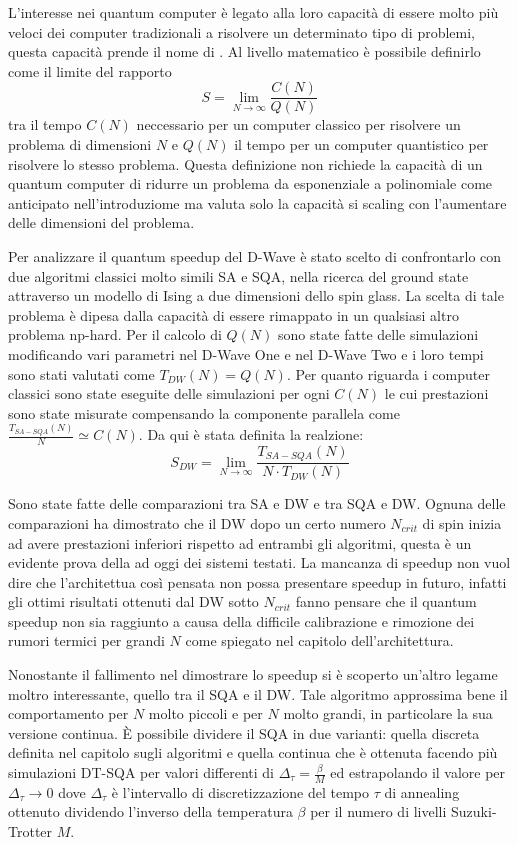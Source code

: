 L'interesse nei quantum computer è legato alla loro capacità di essere molto più veloci dei computer tradizionali a risolvere un determinato tipo di problemi, questa capacità prende il nome di . Al livello matematico è possibile definirlo\cite{DDQS} come il limite del rapporto
$$S = \lim_{N \to \infty} \frac{C(N)}{Q(N)}$$
tra il tempo $C(N)$ neccessario per un computer classico per risolvere un problema di dimensioni $N$ e $Q(N)$ il tempo per un computer quantistico per risolvere lo stesso problema. Questa definizione non richiede la capacità di un quantum computer di ridurre un problema da esponenziale a polinomiale come anticipato nell'introduziome ma valuta solo la capacità si scaling con l'aumentare delle dimensioni del problema.

Per analizzare il quantum speedup del D-Wave è stato scelto di confrontarlo con due algoritmi classici molto simili SA e SQA, nella ricerca del ground state attraverso un modello di Ising a due dimensioni dello spin glass.
La scelta di tale problema è dipesa dalla capacità di essere rimappato in un qualsiasi altro problema np-hard. Per il calcolo di $Q(N)$ sono state fatte delle simulazioni modificando vari parametri nel D-Wave One e nel D-Wave Two e i loro tempi sono stati valutati come $T_{DW}(N) = Q(N)$. Per quanto riguarda i computer classici sono state eseguite delle simulazioni per ogni $C(N)$ le cui prestazioni sono state misurate compensando la componente parallela\cite{EQA} come
 $\frac{T_{SA-SQA}(N)}{N} \simeq C(N)$. Da qui è stata definita\cite{DDQS} la realzione:
$$S_{DW} = \lim_{N \to \infty} \frac{T_{SA-SQA}(N)}{N \cdot T_{DW}(N)}$$

Sono state fatte delle comparazioni tra SA e DW\cite{DDQS} e tra SQA e DW\cite{QVC}. Ognuna delle comparazioni ha dimostrato che il DW dopo un certo numero $N_{crit}$ di spin inizia ad avere prestazioni inferiori rispetto ad entrambi gli algoritmi, questa è un evidente prova della  ad oggi dei sistemi testati. La mancanza di speedup non vuol dire che l'architettua così pensata non possa presentare speedup in futuro, infatti gli ottimi risultati ottenuti dal DW sotto $N_{crit}$ fanno pensare che il quantum speedup non sia raggiunto a causa della difficile calibrazione e rimozione dei rumori termici per grandi $N$ come spiegato nel capitolo dell'architettura.

Nonostante il fallimento nel dimostrare lo speedup si è scoperto un'altro legame moltro interessante, quello tra il SQA e il DW. Tale algoritmo approssima bene il comportamento per $N$ molto piccoli e per $N$ molto grandi\cite{EQA}, in particolare la sua versione continua\cite{QVC}. È possibile dividere il SQA in due varianti: quella  discreta definita nel capitolo sugli algoritmi e quella  continua che è ottenuta facendo più simulazioni DT-SQA per valori differenti di $\Delta_\tau = \frac{\beta}{M}$ ed estrapolando il valore per $\Delta_\tau \to 0$\cite{EQA,QVC} dove $\Delta_\tau$ è l'intervallo di discretizzazione del tempo $\tau$ di annealing ottenuto dividendo l'inverso della temperatura $\beta$ per il numero di livelli Suzuki-Trotter $M$.


